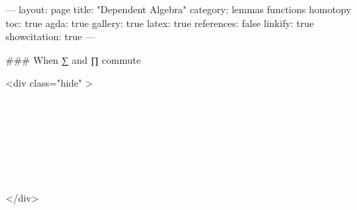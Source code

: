 ---
layout: page
title: "Dependent Algebra"
category: lemmas functions homotopy
toc: true
agda: true
gallery: true
latex: true
references: false
linkify: true
showcitation: true
---

### When ∑ and ∏ commute


<div class="hide" >
\begin{code}%
\>[0]\AgdaSymbol{\{-\#}\AgdaSpace{}%
\AgdaSpace{}%
\AgdaSpace{}%
\AgdaSymbol{\#-\}}\<%
\\
%
\\[\AgdaEmptyExtraSkip]%
\>[0]\AgdaSpace{}%
\AgdaSpace{}%
\<%
\\
\>[0]\AgdaSpace{}%
\AgdaSpace{}%
\<%
\\
%
\\[\AgdaEmptyExtraSkip]%
\>[0]\AgdaSpace{}%
\AgdaSpace{}%
\<%
\\
\>[0]\AgdaSpace{}%
\AgdaSpace{}%
\<%
\end{code}
</div>

